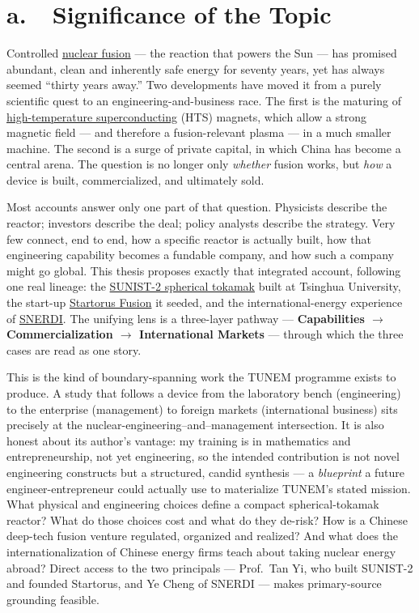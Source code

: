 \documentclass[11pt]{article}
\newcommand{\jl}[2]{\href{#2}{#1}}
\begin{document}
\section*{a.~~Significance of the Topic}
Controlled \jl{nuclear fusion}{https://en.wikipedia.org/wiki/Nuclear_fusion} --- the reaction that powers the Sun --- has promised abundant, clean and inherently safe energy for seventy years, yet has always seemed ``thirty years away.'' Two developments have moved it from a purely scientific quest to an engineering-and-business race. The first is the maturing of \jl{high-temperature superconducting}{https://en.wikipedia.org/wiki/High-temperature_superconductivity} (HTS) magnets, which allow a strong magnetic field --- and therefore a fusion-relevant plasma --- in a much smaller machine.\cite{costley2019,sykes2018} The second is a surge of private capital, in which China has become a central arena. The question is no longer only \emph{whether} fusion works, but \emph{how} a device is built, commercialized, and ultimately sold.

Most accounts answer only one part of that question. Physicists describe the reactor; investors describe the deal; policy analysts describe the strategy. Very few connect, end to end, how a specific reactor is actually built, how that engineering capability becomes a fundable company, and how such a company might go global. This thesis proposes exactly that integrated account, following one real lineage: the \jl{SUNIST-2 spherical tokamak}{https://en.wikipedia.org/wiki/Spherical_tokamak} built at Tsinghua University, the start-up \jl{Startorus Fusion}{https://startorus.com/process/} it seeded, and the international-energy experience of \jl{SNERDI}{https://www.snerdi.com.cn/}. The unifying lens is a three-layer pathway --- \textbf{Capabilities $\rightarrow$ Commercialization $\rightarrow$ International Markets} --- through which the three cases are read as one story.

This is the kind of boundary-spanning work the TUNEM programme exists to produce. A study that follows a device from the laboratory bench (engineering) to the enterprise (management) to foreign markets (international business) sits precisely at the nuclear-engineering--and--management intersection. It is also honest about its author's vantage: my training is in mathematics and entrepreneurship, not yet engineering, so the intended contribution is not novel engineering constructs but a structured, candid synthesis --- a \emph{blueprint} a future engineer-entrepreneur could actually use to materialize TUNEM's stated mission. What physical and engineering choices define a compact spherical-tokamak reactor? What do those choices cost and what do they de-risk? How is a Chinese deep-tech fusion venture regulated, organized and realized? And what does the internationalization of Chinese energy firms teach about taking nuclear energy abroad? Direct access to the two principals --- Prof.\ Tan Yi, who built SUNIST-2 and founded Startorus, and Ye Cheng of SNERDI --- makes primary-source grounding feasible.
\end{document}
